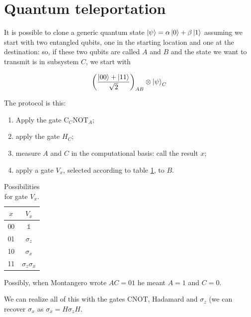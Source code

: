 \documentclass[main.tex]{subfiles}
\begin{document}
\section{Quantum teleportation}

It is possible to clone a generic quantum state \(\ket{\psi } = \alpha \ket{0} + \beta \ket{1}  \) assuming we start with two entangled qubits, one in the starting location and one at the destination: so, if these two qubits are called \(A\) and \(B\) and the state we want to transmit is in subsystem \(C\), we start with

\begin{equation}
    \qty(\frac{\ket{00} + \ket{11} }{\sqrt{2} })_{AB} \otimes \ket{\psi}_C
\end{equation}

The protocol is this:

\begin{enumerate}
    \item Apply the gate \(\text{C}_C\text{NOT}_A\); \label{step:cnot}
    \item apply the gate \(H_C\); \label{step:hadamard}
    \item measure \(A\) and \(C\) in the computational basis: call the result \(x\);
    \item apply a gate \(V_x\), selected according to table \ref{tab:teleportation-gate}, to \(B\).
\end{enumerate}

\begin{table}[H]
    \centering
    \begin{tabular}{c|c}
        \(x\) & \(V_x\) \\
        \hline
        00 & \(\mathbb 1\) \\
        01 & \(\sigma_z\) \\
        10 & \(\sigma_x\) \\
        11 & \(\sigma_z \sigma_x\)
    \end{tabular}
    \caption{Possibilities for gate \(V_x\). }
    \label{tab:teleportation-gate}
\end{table}

\begin{greenbox}
  Possibly, when Montangero wrote \(AC=01\) he meant \(A=1\) and \(C=0\).
\end{greenbox}

We can realize all of this with the gates \(\text{CNOT}\), Hadamard and \(\sigma_z\) (we can recover \(\sigma_x\) as \(\sigma_x = H \sigma_z H\).
\end{document}

